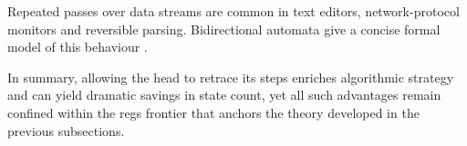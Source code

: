 \begin{observation}\label{obs:two-way-app}
Repeated passes over data streams are common in text editors,
network-protocol monitors and reversible parsing.
Bidirectional automata give a concise formal model of this behaviour
\cite{shepherdson1959reduction}.
\end{observation}

In summary, allowing the head to retrace its steps enriches algorithmic
strategy and can yield dramatic savings in state count,
yet all such advantages remain confined within the \glspl{reg}
frontier that anchors the theory developed in the previous subsections.
